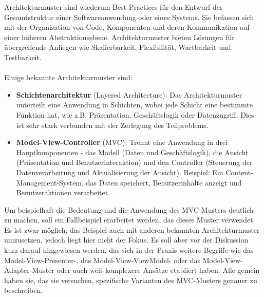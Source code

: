 Architekturmuster sind wiederum Best Practices für den Entwurf der Gesamtstruktur einer Softwareanwendung oder eines Systems. Sie befassen sich mit der Organisation von Code, Komponenten und deren Kommunikation auf einer höheren Abstraktionsebene. Architekturmuster bieten Lösungen für übergreifende Anliegen wie Skalierbarkeit, Flexibilität, Wartbarkeit und Testbarkeit.
\\\\
Einige bekannte Architekturmuster sind:
\begin{itemize}
\item \textbf{Schichtenarchitektur} (Layered Architecture): Das Architekturmuster unterteilt eine Anwendung in Schichten, wobei jede Schicht eine bestimmte Funktion hat, wie z.B. Präsentation, Geschäftslogik oder Datenzugriff. Dies ist sehr stark verbunden mit der Zerlegung des Teilproblems.
\item \textbf{Model-View-Controller} (MVC): Trennt eine Anwendung in drei Hauptkomponenten - das Modell (Daten und Geschäftslogik), die Ansicht (Präsentation und Benutzerinteraktion) und den Controller (Steuerung der Datenverarbeitung und Aktualisierung der Ansicht). Beispiel: Ein Content-Management-System, das Daten speichert, Benutzerinhalte anzeigt und Benutzeraktionen verarbeitet.
\end{itemize}
Um beispielhaft die Bedeutung und die Anwendung des MVC-Musters deutlich zu machen, soll ein Fallbeispiel erarbeitet werden, das dieses Muster verwendet. Es ist zwar möglich, das Beispiel auch mit anderen bekannten Architekturmuster umzusetzen, jedoch liegt hier nicht der Fokus. Es soll aber vor der Diskussion kurz darauf hingewiesen werden, das sich in der Praxis  weitere Begriffe wie das Model-View-Presenter-, das Model-View-ViewModel- oder das Model-View-Adapter-Muster oder auch weit komplexere Ansätze etabliert haben. Alle gemein haben sie, das sie versuchen, spezifische Varianten des MVC-Musters genauer zu beschreiben.

